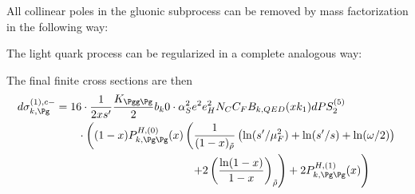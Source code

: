 All collinear poles in the gluonic subprocess can be removed by mass factorization in the following way:

The light quark process can be regularized in a complete analogous way:

The final finite cross sections are then
\begin{align}
d\sigma_{k,\Pg}^{(1),c-} &= 16\cdot \frac 1 {2xs'} \frac {K_{\Pgg\Pg}} 2 b_k{0} \cdot \alpha_S^2e^2e_H^2N_C C_F B_{k,QED}(xk_1) dPS_{2}^{(5)} \nonumber\\
 &\hspace{20pt}\cdot \left( (1-x)P_{k,\Pg\Pg}^{H,(0)}(x)\left(\frac{1}{(1-x)_{\tilde\rho}}\left(\ln(s'/\mu_F^2) + \ln(s'/s) + \ln(\omega/2)\right) \right.\right.\nonumber\\
 &\hspace{120pt} \left.\left. + 2\left(\frac{\ln(1-x)}{1-x}\right)_{\tilde\rho} \right) + 2P_{k,\Pg\Pg}^{H,(1)}(x)\right)
\end{align}


